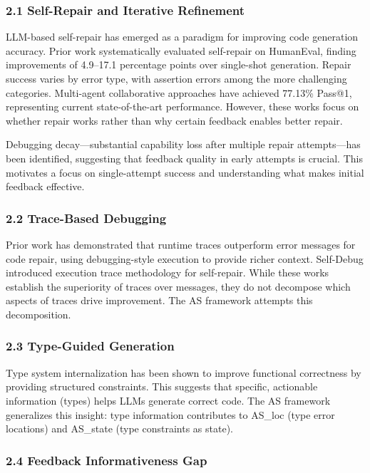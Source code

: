 
\subsubsection{2.1 Self-Repair and Iterative Refinement}

LLM-based self-repair has emerged as a paradigm for improving code generation accuracy. Prior work systematically evaluated self-repair on HumanEval, finding improvements of 4.9--17.1 percentage points over single-shot generation. Repair success varies by error type, with assertion errors among the more challenging categories. Multi-agent collaborative approaches have achieved 77.13\% Pass@1, representing current state-of-the-art performance. However, these works focus on whether repair works rather than why certain feedback enables better repair.

Debugging decay---substantial capability loss after multiple repair attempts---has been identified, suggesting that feedback quality in early attempts is crucial. This motivates a focus on single-attempt success and understanding what makes initial feedback effective.

\subsubsection{2.2 Trace-Based Debugging}

Prior work has demonstrated that runtime traces outperform error messages for code repair, using debugging-style execution to provide richer context. Self-Debug introduced execution trace methodology for self-repair. While these works establish the superiority of traces over messages, they do not decompose which aspects of traces drive improvement. The AS framework attempts this decomposition.

\subsubsection{2.3 Type-Guided Generation}

Type system internalization has been shown to improve functional correctness by providing structured constraints. This suggests that specific, actionable information (types) helps LLMs generate correct code. The AS framework generalizes this insight: type information contributes to AS\_loc (type error locations) and AS\_state (type constraints as state).

\subsubsection{2.4 Feedback Informativeness Gap}

